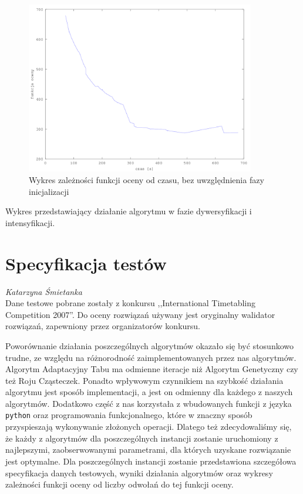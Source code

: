 \begin{figure}[H]
  \caption{Wykres zależności funkcji oceny od czasu, bez uwzględnienia fazy inicjalizacji}
  \centering
    \includegraphics[width=10cm]{szczegolowy2_instancja.png}
\end{figure}
Wykres przedstawiający działanie algorytmu w fazie dywersyfikacji i intensyfikacji.
\section{Specyfikacja testów}
\textit{Katarzyna Śmietanka} 
\\
Dane testowe pobrane zostały z konkursu ,,International Timetabling Competition 2007''. Do oceny rozwiązań używany jest oryginalny walidator rozwiązań, zapewniony przez organizatorów konkursu.
\par Poworównanie działania poszczególnych algorytmów okazało się być stosunkowo trudne, ze względu na różnorodność zaimplementowanych przez nas algorytmów. Algorytm Adaptacyjny Tabu ma odmienne iteracje niż Algorytm Genetyczny czy też Roju Cząsteczek. Ponadto wpływowym czynnikiem na szybkość działania algorytmu jest sposób implementacji, a jest on odmienny dla każdego z naszych algorytmów. Dodatkowo część z nas korzystała z wbudowanych funkcji z języka \verb#python# oraz programowania funkcjonalnego, które w znaczny sposób przyspieszają wykonywanie złożonych operacji. Dlatego też zdecydowaliśmy się, że każdy z algorytmów dla poszczególnych instancji zostanie uruchomiony z najlepszymi, zaobserwowanymi parametrami, dla których uzyskane rozwiązanie jest optymalne. Dla poszczególnych instancji zostanie przedstawiona szczegółowa specyfikacja danych testowych, wyniki działania algorytmów oraz wykresy zależności funkcji oceny od liczby odwołań do tej funkcji oceny.
